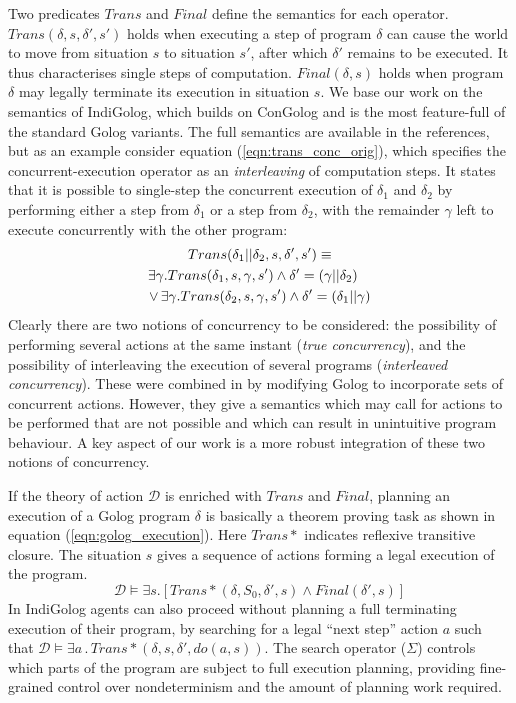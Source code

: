 Two predicates $Trans$ and $Final$ define the semantics for each
operator. $Trans(\delta,s,\delta',s')$ holds when executing a step
of program $\delta$ can cause the world to move from situation $s$
to situation $s'$, after which $\delta'$ remains to be executed.
It thus characterises single steps of computation. $Final(\delta,s)$
holds when program $\delta$ may legally terminate its execution in
situation $s$. We base our work on the semantics of IndiGolog, which
builds on ConGolog and is the most feature-full of the standard Golog
variants. The full semantics are available in the references, but
as an example consider equation (\ref{eqn:trans_conc_orig}), which
specifies the concurrent-execution operator as an \emph{interleaving}
of computation steps. It states that it is possible to single-step
the concurrent execution of $\delta_{1}$ and $\delta_{2}$ by performing
either a step from $\delta_{1}$ or a step from $\delta_{2}$, with
the remainder $\gamma$ left to execute concurrently with the other
program:\begin{multline}
Trans(\delta_{1}||\delta_{2},s,\delta',s')\equiv\\
\shoveright{\exists\gamma.Trans(\delta_{1},s,\gamma,s')\wedge\delta'=(\gamma||\delta_{2})}\\
\vee\,\exists\gamma.Trans(\delta_{2},s,\gamma,s')\wedge\delta'=(\delta_{1}||\gamma)\label{eqn:Background:trans_conc_orig}\end{multline}
 Clearly there are two notions of concurrency to be considered: the
possibility of performing several actions at the same instant (\emph{true
concurrency}), and the possibility of interleaving the execution of
several programs (\emph{interleaved concurrency}). These were combined
in \citet{pinto99tcongolog} by modifying Golog to incorporate sets
of concurrent actions. However, they give a semantics which may call
for actions to be performed that are not possible and which can result
in unintuitive program behaviour. A key aspect of our work is a more
robust integration of these two notions of concurrency.

If the theory of action $\mathcal{D}$ is enriched with $Trans$ and
$Final$, planning an execution of a Golog program $\delta$ is basically
a theorem proving task as shown in equation (\ref{eqn:golog_execution}).
Here $Trans*$ indicates reflexive transitive closure. The situation
$s$ gives a sequence of actions forming a legal execution of the
program.\begin{equation}
\mathcal{D}\models\exists s.\left[Trans*(\delta,S_{0},\delta',s)\wedge Final(\delta',s)\right]\label{eqn:Background:golog_execution}\end{equation}
 In IndiGolog agents can also proceed without planning a full terminating
execution of their program, by searching for a legal {}``next step''
action $a$ such that $\mathcal{D}\models\exists a\,.\, Trans*(\delta,s,\delta',do(a,s))$.
The search operator ($\Sigma$) controls which parts of the program
are subject to full execution planning, providing fine-grained control
over nondeterminism and the amount of planning work required.


